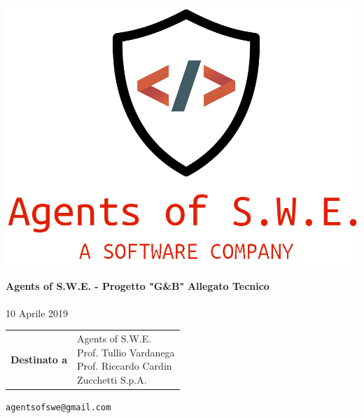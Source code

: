 


\begin{titlepage}
\thispagestyle{empty}

\begin{center}

\includegraphics[scale=0.3]{./images/logo.png} 

\large \textbf{Agents of S.W.E. - Progetto "G\&B"}
\vfill
\Huge \textbf{Allegato Tecnico}\\ \\ \normalsize 10 Aprile 2019
\vfill
\large
\renewcommand{\arraystretch}{1.3}
\begin{tabular}{r|l}
\textbf{Destinato a} & \parbox[t]{5cm}{Agents of S.W.E. \\Prof. Tullio Vardanega\\Prof. Riccardo Cardin \\ Zucchetti S.p.A.}
\end{tabular}
\vfill
\small
\texttt{agentsofswe@gmail.com}
\end{center}
\end{titlepage}

